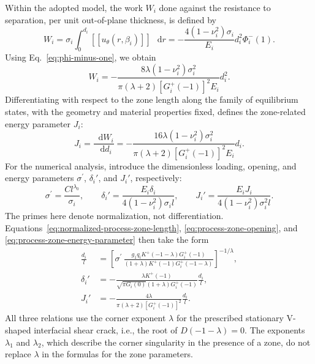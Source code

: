 \documentclass[pdflatex,onecolumn,sn-mathphys-ay]{sn-jnl}
\newcommand{\dd}{\mathop{}\!\mathrm{d}}
\newcommand{\sigmap}{\sigma^{\prime}}
\newcommand{\jump}[1]{\left[\!\left[#1\right]\!\right]}
\begin{document}
Within the adopted model, the work $W_i$ done against the resistance
to separation, per unit out-of-plane thickness, is defined
by~\citep{Cherepanov1986}
\begin{equation*}
  W_i=\sigma_i\int_0^{d_i}
      \jump{u_\theta(r,\beta_i)}\,\dd r
  =-\frac{4(1-\nu_i^2)\sigma_i}{E_i}d_i^2\Phi_i^-(1).
\end{equation*}
Using Eq.~\eqref{eq:phi-minus-one}, we obtain
\begin{equation*}
  W_i=-\frac{8\lambda(1-\nu_i^2)\sigma_i^2}
  {\pi(\lambda+2)[G_i^+(-1)]^2E_i}d_i^2.
\end{equation*}
Differentiating with respect to the zone length along the family of
equilibrium states, with the geometry and material properties fixed,
defines the zone-related energy parameter $J_i$:
\begin{equation}
\label{eq:process-zone-energy-parameter}
  J_i=\frac{\dd W_i}{\dd d_i}
  =-\frac{16\lambda(1-\nu_i^2)\sigma_i^2}
  {\pi(\lambda+2)[G_i^+(-1)]^2E_i}d_i.
\end{equation}
For the numerical analysis, introduce the dimensionless loading,
opening, and energy parameters $\sigmap$, $\delta_i'$, and $J_i'$,
respectively:
\begin{equation*}
  \sigmap=\frac{Cl^{\lambda_0}}{\sigma_i},
  \qquad
  \delta_i'=\frac{E_i\delta_i}
  {4(1-\nu_i^2)\sigma_i l},
  \qquad
  J_i'=\frac{E_iJ_i}
  {4(1-\nu_i^2)\sigma_i^2l}.
\end{equation*}
The primes here denote normalization, not differentiation.
Equations~\eqref{eq:normalized-process-zone-length},
\eqref{eq:process-zone-opening}, and
\eqref{eq:process-zone-energy-parameter} then take the form
\begin{equation*}
\begin{aligned}
  \frac{d_i}{l}
    &=\left[
      \sigmap\,
      \frac{g_1q_iK^+(-1-\lambda)G_i^+(-1)}
      {(1+\lambda)K^+(-1)G_i^+(-1-\lambda)}
    \right]^{-1/\lambda},\\[2pt]
  \delta_i'
    &=-\frac{\lambda K^+(-1)}
      {\sqrt{\pi G_i(0)}(1+\lambda)G_i^+(-1)}
      \frac{d_i}{l},\\[2pt]
  J_i'
    &=-\frac{4\lambda}
      {\pi(\lambda+2)[G_i^+(-1)]^2}
      \frac{d_i}{l}.
\end{aligned}
\end{equation*}
All three relations use the corner exponent $\lambda$ for the prescribed
stationary V-shaped interfacial shear crack, i.e., the root of
$D(-1-\lambda)=0$.
The exponents $\lambda_1$ and $\lambda_2$, which describe the corner
singularity in the presence of a zone, do not replace $\lambda$
in the formulas for the zone parameters.
\end{document}
